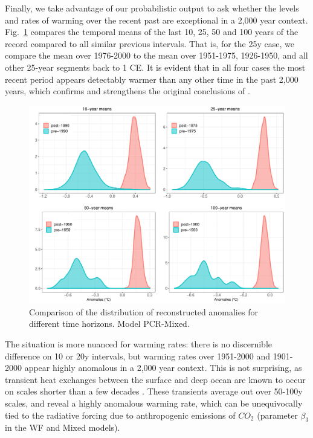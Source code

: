 \documentclass[12pt]{amsart}
\theoremstyle{plain}
\theoremstyle{definition}
\theoremstyle{remark}
\begin{document}
Finally, we take advantage of our probabilistic output to ask whether the levels and rates of warming over the recent past are exceptional in a 2,000 year context.  Fig.~\ref{fig:compmeans} compares the temporal means of the last 10, 25, 50 and 100 years of the record compared to all similar previous intervals. That is, for the 25y case, we compare the mean over 1976-2000 to the mean over 1951-1975, 1926-1950, and all other 25-year segments back to 1 CE. It is evident that in all four cases the most recent period appears detectably warmer than any other time in the past 2,000 years, which confirms and strengthens the original conclusions of \cite{MBH99}.  

\begin{figure}
  \centering
  \includegraphics[scale=0.35]{compMeans}
  \caption{Comparison of the distribution of reconstructed anomalies for different time horizons. Model PCR-Mixed. }
  \label{fig:compmeans}
\end{figure}

The situation is more nuanced for warming rates: there is no discernible difference on 10 or 20y intervals, but warming rates over 1951-2000 and 1901-2000 appear highly anomalous in a 2,000 year context. This is not surprising, as transient heat exchanges between the surface and deep ocean are known to occur on scales shorter than a few decades \citep{Hansen:2005}. These transients average out over 50-100y scales, and reveal a highly anomalous warming rate, which can be unequivocally tied to the radiative forcing due to anthropogenic emissions of $CO_2$ (parameter $\beta_3$ in the WF and Mixed models).
\end{document}
